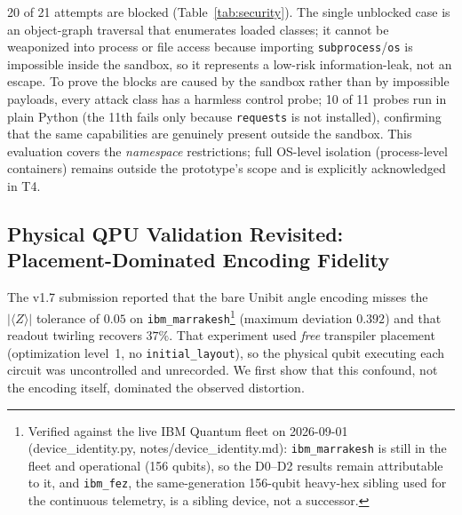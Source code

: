 ﻿\documentclass[12pt,a4paper]{article}
\begin{document}
\begin{table}[H]
\centering
\caption{Sandbox Security Evaluation: 21 Escape Attempts Against a 3-Layer Defense}
\label{tab:security}
\small
{}
\end{table}

20 of 21 attempts are blocked (Table~\ref{tab:security}). The single unblocked case is an object-graph traversal that enumerates loaded classes; it cannot be weaponized into process or file access because importing \texttt{subprocess}/\texttt{os} is impossible inside the sandbox, so it represents a low-risk information-leak, not an escape. To prove the blocks are caused by the sandbox rather than by impossible payloads, every attack class has a harmless control probe; 10 of 11 probes run in plain Python (the 11th fails only because \texttt{requests} is not installed), confirming that the same capabilities are genuinely present outside the sandbox. This evaluation covers the \emph{namespace} restrictions; full OS-level isolation (process-level containers) remains outside the prototype's scope and is explicitly acknowledged in T4.

\subsection{Physical QPU Validation Revisited: Placement-Dominated Encoding Fidelity}\label{sec:qpu}

The v1.7 submission reported that the bare Unibit angle encoding misses the $|\langle Z\rangle|$ tolerance of $0.05$ on \texttt{ibm\_marrakesh}\footnote{Verified against the live IBM Quantum fleet on 2026-09-01 (device\_identity.py, notes/device\_identity.md): \texttt{ibm\_marrakesh} is still in the fleet and operational (156 qubits), so the D0--D2 results remain attributable to it, and \texttt{ibm\_fez}, the same-generation 156-qubit heavy-hex sibling used for the continuous telemetry, is a sibling device, not a successor.} (maximum deviation $0.392$) and that readout twirling recovers $37\%$. That experiment used \emph{free} transpiler placement (optimization level~1, no \texttt{initial\_layout}), so the physical qubit executing each circuit was uncontrolled and unrecorded. We first show that this confound, not the encoding itself, dominated the observed distortion.
\end{document}
